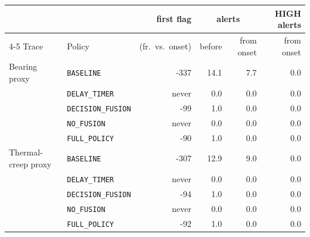\begin{tabular}{@{}llrrrr@{}}
\toprule
 & & first flag & \multicolumn{2}{c}{alerts} & HIGH alerts \\
\cmidrule(lr){4-5}
Trace & Policy & (fr.\ vs.\ onset) & before & from onset & from onset \\
\midrule
Bearing proxy & \texttt{BASELINE} & -337 & 14.1 & 7.7 & 0.0 \\
 & \texttt{DELAY\_TIMER} & never & 0.0 & 0.0 & 0.0 \\
 & \texttt{DECISION\_FUSION} & -99 & 1.0 & 0.0 & 0.0 \\
 & \texttt{NO\_FUSION} & never & 0.0 & 0.0 & 0.0 \\
 & \texttt{FULL\_POLICY} & -90 & 1.0 & 0.0 & 0.0 \\
\midrule
Thermal-creep proxy & \texttt{BASELINE} & -307 & 12.9 & 9.0 & 0.0 \\
 & \texttt{DELAY\_TIMER} & never & 0.0 & 0.0 & 0.0 \\
 & \texttt{DECISION\_FUSION} & -94 & 1.0 & 0.0 & 0.0 \\
 & \texttt{NO\_FUSION} & never & 0.0 & 0.0 & 0.0 \\
 & \texttt{FULL\_POLICY} & -92 & 1.0 & 0.0 & 0.0 \\
\bottomrule
\end{tabular}
